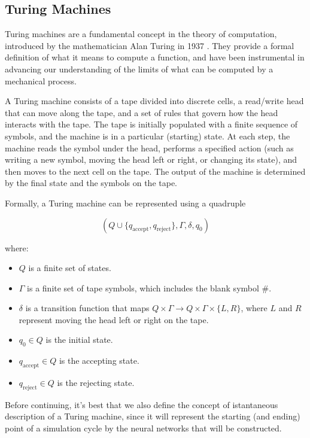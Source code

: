 \documentclass{article}
\begin{document}
\subsection{Turing Machines}

Turing machines are a fundamental concept in the theory of computation, introduced by the mathematician Alan Turing in 1937 \cite{TUR37}. They provide a formal definition of what it means to compute a function, and have been instrumental in advancing our understanding of the limits of what can be computed by a mechanical process.

A Turing machine consists of a tape divided into discrete cells, a read/write head that can move along the tape, and a set of rules that govern how the head interacts with the tape. The tape is initially populated with a finite sequence of symbols, and the machine is in a particular (starting) state. At each step, the machine reads the symbol under the head, performs a specified action (such as writing a new symbol, moving the head left or right, or changing its state), and then moves to the next cell on the tape. The output of the machine is determined by the final state and the symbols on the tape.

Formally, a Turing machine can be represented using a quadruple

\begin{equation}
(Q \cup \{q_{\mathrm{accept}}, q_{\mathrm{reject}} \}, \Gamma, \delta, q_0)
\end{equation}

where:

\begin{itemize}
    \item $Q$ is a finite set of states.
    \item $\Gamma$ is a finite set of tape symbols, which includes the blank symbol $\#$.
    \item $\delta$ is a transition function that maps $Q \times \Gamma \rightarrow Q \times \Gamma \times \{L, R\}$, where $L$ and $R$ represent moving the head left or right on the tape.
    \item $q_0 \in Q$ is the initial state.
    \item $q_{\mathrm{accept}} \in Q$ is the accepting state.
    \item $q_{\mathrm{reject}} \in Q$ is the rejecting state.
\end{itemize}

Before continuing, it's best that we also define the concept of istantaneous description of a Turing machine, since it will represent the starting (and ending) point of a simulation cycle by the neural networks that will be constructed.
\end{document}
